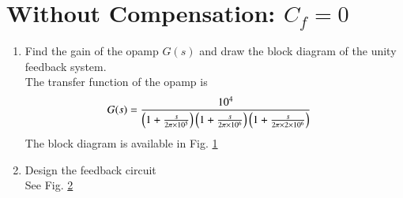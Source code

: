 \section{Without Compensation: $C_f = 0$}
\begin{enumerate}[label=\thesection.\arabic*.,ref=\thesection.\theenumi]
\item Find the gain of the opamp $G(s)$ and draw the block diagram of the unity feedback system.
\\
\solution The transfer function of the opamp is
\begin{align}
   G(s)&= \frac{10^{4}}{\left(1+\frac{s}{2\pi\times10^{5}}\right)\left(1+\frac{s}{2\pi\times10^{6}}\right)\left(1+\frac{s}{2\pi\times2\times10^{6}}\right)}
\end{align}
The block diagram is available in Fig. 	\ref{fig:ee18btech11029_block}

\begin{figure}[ht!]
	\begin{center}
		\resizebox{\columnwidth}{!}{}
	\end{center}
	\caption{}
	\label{fig:ee18btech11029_block}
\end{figure}
%
%
\item Design the feedback circuit
\\
\solution See Fig. 	\ref{fig:ee18btech11029_fig1}

\begin{figure}[ht!]
	\begin{center}
		\resizebox{\columnwidth}{!}{}
	\end{center}
	\caption{}
	\label{fig:ee18btech11029_fig1}
\end{figure}


\end{enumerate}

